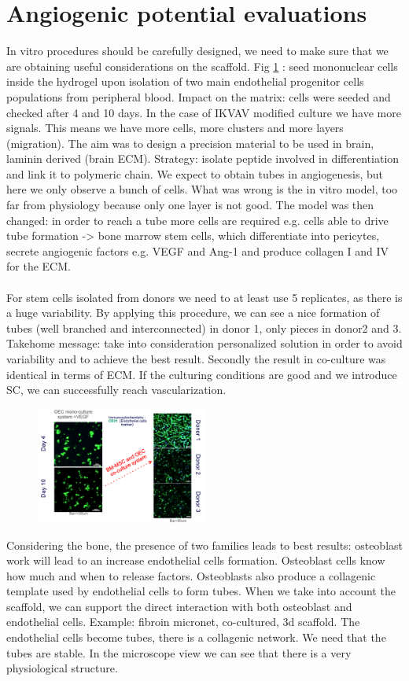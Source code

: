 \section{Angiogenic potential evaluations}
In vitro procedures should be carefully designed, we need to make sure that we are obtaining useful considerations on the scaffold.
Fig \ref{fig:coculture} : seed mononuclear cells inside the hydrogel upon isolation of two main endothelial progenitor cells populations from peripheral blood.
Impact on the matrix: cells were seeded and checked after 4 and 10 days. In the case of IKVAV modified culture we have more signals. This means we have more cells, more clusters and more layers (migration). The aim was to design a precision material to be used in brain, laminin derived (brain ECM). Strategy:  isolate peptide involved in differentiation and link it to polymeric chain.
We expect to obtain tubes in angiogenesis, but here we only observe a bunch of cells. What was wrong is the in vitro model, too far from physiology because only one layer is not good. The model was then changed: in order to reach a tube more cells are required e.g. cells able to drive tube formation -> bone marrow stem cells, which differentiate into pericytes, secrete angiogenic factors e.g. VEGF and Ang-1 and produce collagen I and IV for the ECM.
\\
\\
\noindent
For stem cells isolated from donors we need to at least use 5 replicates, as there is a huge variability.  By applying this procedure, we can see a nice formation of tubes (well branched and interconnected) in donor 1, only pieces in donor2 and 3. Takehome message: take into consideration personalized solution in order to avoid variability and to achieve the best result. Secondly the result in co-culture was identical in terms of ECM. If the culturing conditions are good and we introduce SC, we can successfully reach vascularization.

\begin{figure}[h]
\centering
\includegraphics[width=0.5\textwidth]{coculture}
\caption{\label{fig:coculture}}
\end{figure}
\noindent
Considering the bone, the presence of two families leads to best results: osteoblast work will lead to an increase endothelial cells formation. Osteoblast cells know how much and when to release factors. Osteoblasts also produce a collagenic template used by endothelial cells to form tubes. When we take into account the scaffold, we can support the direct interaction with both osteoblast and endothelial cells.
Example: fibroin micronet, co-cultured, 3d scaffold. The endothelial cells become tubes, there is a collagenic network.
We need that the tubes are stable. In the microscope view we can see that there is a very physiological structure.

